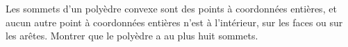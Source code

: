 Les sommets d'un polyèdre convexe sont des points à coordonnées entières, et aucun autre point à coordonnées entières n'est à l'intérieur, sur les faces ou sur les arêtes. Montrer que le polyèdre a au plus huit sommets.
